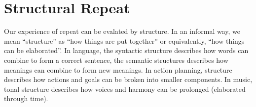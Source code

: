









% 

\section{Structural Repeat}
Our experience of repeat can be evalated by structure. In an informal way, we mean ``structure'' as ``how things are put together'' or equivalently, ``how things can be elaborated''. In language, the syntactic structure describes how words can combine to form a correct sentence, the semantic structures describes how meanings can combine to form new meanings. In action planning, structure describes how actions and goals can be broken into smaller components. In music, tonal structure describes how voices and harmony can be prolonged (elaborated through time). 

